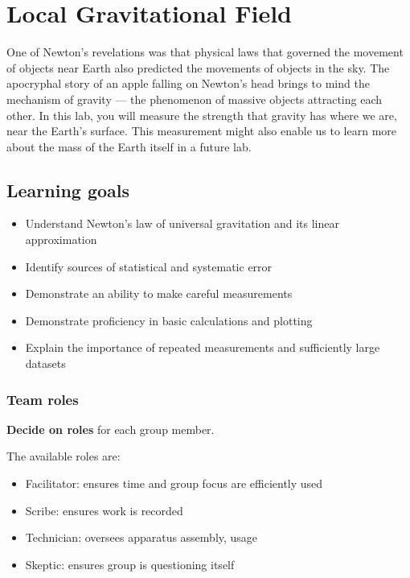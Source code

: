 \chapter{Local Gravitational Field}

One of Newton's revelations was that physical laws that governed the movement of objects near Earth also predicted the movements of objects in the sky.
The apocryphal story of an apple falling on Newton's head brings to mind the mechanism of gravity --- the phenomenon of massive objects attracting each other.
In this lab, you will measure the strength that gravity has where we are, near the Earth's surface. This measurement might also enable us to learn more about the mass of the Earth itself in a future lab.

\section{Learning goals}

\begin{itemize}
	\item Understand Newton's law of universal gravitation and its linear approximation
	
	\item Identify sources of statistical and systematic error
	
	\item Demonstrate an ability to make careful measurements
	
	\item Demonstrate proficiency in basic calculations and plotting
	
	\item Explain the importance of repeated measurements and sufficiently large datasets
\end{itemize}

\subsection{Team roles}

\begin{steps}
	\item \textbf{Decide on roles} for each group member.
\end{steps}

The available roles are:
\begin{itemize}
	\item Facilitator: ensures time and group focus are efficiently used
	\item Scribe: ensures work is recorded
	\item Technician: oversees apparatus assembly, usage
	\item Skeptic: ensures group is questioning itself
\end{itemize}

